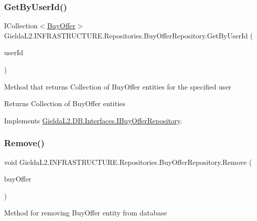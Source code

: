\subsubsection{\texorpdfstring{GetByUserId()}{GetByUserId()}}
{\footnotesize\ttfamily I\+Collection$<$\mbox{\hyperlink{class_gielda_l2_1_1_d_b_1_1_entities_1_1_buy_offer}{Buy\+Offer}}$>$ Gielda\+L2.\+I\+N\+F\+R\+A\+S\+T\+R\+U\+C\+T\+U\+R\+E.\+Repositories.\+Buy\+Offer\+Repository.\+Get\+By\+User\+Id (\begin{DoxyParamCaption}\item[{int}]{user\+Id }\end{DoxyParamCaption})}



Method that returns Collection of Buy\+Offer entities for the specified user 

\begin{DoxyReturn}{Returns}
Collection of Buy\+Offer entities
\end{DoxyReturn}


Implements \mbox{\hyperlink{interface_gielda_l2_1_1_d_b_1_1_interfaces_1_1_i_buy_offer_repository_a65cd54e2405e6121a0e1d7bb91184337}{Gielda\+L2.\+D\+B.\+Interfaces.\+I\+Buy\+Offer\+Repository}}.

\mbox{\label{class_gielda_l2_1_1_i_n_f_r_a_s_t_r_u_c_t_u_r_e_1_1_repositories_1_1_buy_offer_repository_a14dec5a8063f5d8b6a106f65fc6ec293}} 
\subsubsection{\texorpdfstring{Remove()}{Remove()}}
{\footnotesize\ttfamily void Gielda\+L2.\+I\+N\+F\+R\+A\+S\+T\+R\+U\+C\+T\+U\+R\+E.\+Repositories.\+Buy\+Offer\+Repository.\+Remove (\begin{DoxyParamCaption}\item[{\mbox{\hyperlink{class_gielda_l2_1_1_d_b_1_1_entities_1_1_buy_offer}{Buy\+Offer}}}]{buy\+Offer }\end{DoxyParamCaption})}



Method for removing Buy\+Offer entity from database 


